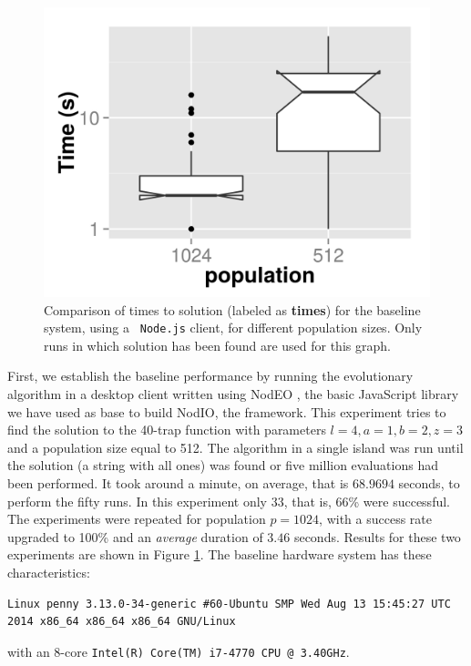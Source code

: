\documentclass[journal,onecolumn]{IEEEtran}
\begin{document}
\begin{figure}[!t]
\centering
\includegraphics[width=12cm]{baseline-times.png}
\caption{Comparison of times to solution (labeled as {\bf times}) for the baseline system, using a {\tt
    Node.js} client, for different population sizes. Only
runs in which solution has been found are used for this graph.}
\label{fig:baseline}
\end{figure}
First, we establish the baseline performance by running the
evolutionary algorithm in a desktop client written using {\sf NodEO}
\cite{nodeo2014}, the basic JavaScript library we have used as base to
build {\sf NodIO}, the framework. This experiment tries to 
find the solution to the 40-trap function with parameters $l=4, a=1,
b=2, z=3$ and a population size equal to 512. The algorithm in a
single island was run until the solution (a string with all
ones) was found or five million evaluations had been performed. It
took around a minute, on average, that is $68.9694$ seconds, to
perform the fifty runs. In this experiment only 33, that is, 66\% were
successful. The experiments were repeated for population $p=1024$,
with a success rate upgraded to 100\% and an {\em average} duration of $3.46$
seconds. Results for these two experiments
are shown in Figure \ref{fig:baseline}. The baseline hardware system has these
characteristics: 
\begin{verbatim}
Linux penny 3.13.0-34-generic #60-Ubuntu SMP Wed Aug 13 15:45:27 UTC
2014 x86_64 x86_64 x86_64 GNU/Linux
\end{verbatim}
with an 8-core {\tt Intel(R) Core(TM) i7-4770 CPU @ 3.40GHz}.
\end{document}
